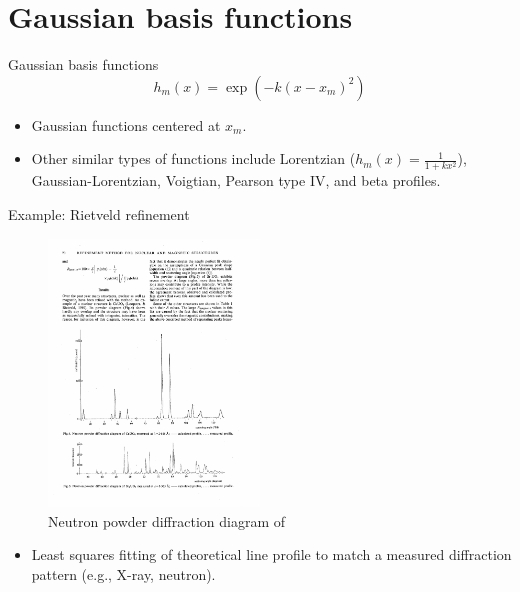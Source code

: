\documentclass[aspectratio=169]{beamer}
\begin{document}
\section{Gaussian basis functions}


\begin{frame}{Gaussian basis functions}
    \begin{equation*}
        h_m(x) = \exp(-k(x - x_m) ^ 2)
    \end{equation*}
    \begin{itemize}
        \item Gaussian functions centered at $x_m$.
        \item Other similar types of functions include Lorentzian ($h_m(x) = \frac{1}{1 + kx^2}$), Gaussian-Lorentzian, Voigtian, Pearson type IV, and beta profiles.
    \end{itemize}
\end{frame} 


\begin{frame}{Example: Rietveld refinement}
\begin{figure}
    \centering
    \includegraphics[width=0.5\textwidth]{figures/rietveld.pdf}
    \caption{Neutron powder diffraction diagram of }
\end{figure}
    \begin{itemize}
        \item Least squares fitting of theoretical line profile to match a measured diffraction pattern (e.g., X-ray, neutron).\cite{rietveldProfileRefinementMethod1969}
    \end{itemize}
\end{frame} 
\end{document}
